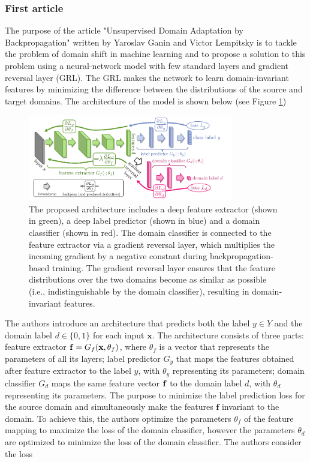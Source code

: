 \subsubsection{First article}

The purpose of the article "Unsupervised Domain Adaptation by Backpropagation" written by Yaroslav Ganin and Victor Lempitsky \cite{ganin2015unsupervised} is to tackle the problem of domain shift in machine learning and to propose a solution to this problem using a neural-network model with few standard layers and gradient reversal layer (GRL). The GRL makes the network to learn domain-invariant features by minimizing the difference between the distributions of the source and target domains. The architecture of the model is shown below (see Figure \ref{fig: uda_back})

\begin{figure}[H]
    \centering
    \includegraphics[width=0.8\textwidth]{Figures/From articles/uda_backpropagation.png}
    \caption{The proposed architecture includes a deep feature extractor (shown in green), a deep label predictor (shown in blue) and a domain classifier (shown in red). The domain classifier is connected to the feature extractor via a gradient reversal layer, which multiplies the incoming gradient by a negative constant during backpropagation-based training. The gradient reversal layer ensures that the feature distributions over the two domains become as similar as possible (i.e., indistinguishable by the domain classifier), resulting in domain-invariant features.}
    \label{fig: uda_back}
\end{figure}

The authors introduce an architecture that predicts both the label $y \in Y$ and the domain label $d \in \{0, 1\}$ for each input $\textbf{x}$. The architecture consists of three parts: feature extractor $\bold{f} = G_f(\textbf{x}, \theta_f)$, where $\theta_f$ is a vector that represents the parameters of all its layers; label predictor $G_y$ that maps the features obtained after feature extractor to the label $y$, with $\theta_y$ representing its parameters; domain classifier $G_d$ maps the same feature vector $\bold{f}$ to the domain label $d$, with $\theta_d$ representing its parameters. The purpose to minimize the label prediction loss for the source domain and simultaneously make the features $\textbf{f}$ invariant to the domain. To achieve this, the authors optimize the parameters $\theta_f$ of the feature mapping to maximize the loss of the domain classifier, however the parameters $\theta_d$ are optimized to minimize the loss of the domain classifier. The authors consider the loss

